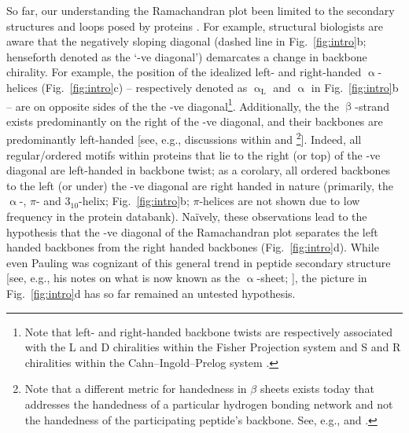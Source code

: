 \documentclass[fleqn,10pt]{wlpeerj} %
\newcommand{\Fig}[1]{Fig.~\ref{#1}}
\begin{document}
So far, our understanding the Ramachandran plot been limited to the secondary structures and loops posed by proteins \citep{Berman2000}. For example, structural biologists are aware that the negatively sloping diagonal (dashed line in \Fig{fig:intro}b; henseforth denoted as the `-ve diagonal') demarcates a change in backbone chirality. For example, the position of the idealized left- and right-handed $\upalpha$-helices (\Fig{fig:intro}c) -- respectively denoted as $\upalpha_\textrm{L}$ and $\upalpha$ in \Fig{fig:intro}b -- are on opposite sides of the the -ve diagonal\footnote{Note that left- and right-handed backbone twists are respectively associated with the L and D chiralities within the Fisher Projection system and S and R chiralities within the Cahn--Ingold--Prelog system \citep{Cross2013}.}. Additionally, the the $\upbeta$-strand exists predominantly on the right of the -ve diagonal, and their backbones are predominantly left-handed [see, e.g., discussions within \cite{Quiocho1977} and \cite{Shaw1977}\footnote{Note that a different metric for handedness in $\beta$ sheets exists today that addresses the handedness of a particular hydrogen bonding network and not the handedness of the participating peptide's backbone. See, e.g., \cite{Schulz1974} and \cite{Chothia1977}.}]. Indeed, all regular/ordered motifs within proteins that lie to the right (or top) of the -ve diagonal are left-handed in backbone twist; as a corolary, all ordered backbones to the left (or under) the -ve diagonal are right handed in nature (primarily, the $\upalpha$-, $\pi$- and $3_{10}$-helix; \Fig{fig:intro}b; $\pi$-helices are not shown due to low frequency in the protein databank). Na{\"i}vely, these observations lead to the hypothesis that the -ve diagonal of the Ramachandran plot separates the left handed backbones from the right handed backbones (\Fig{fig:intro}d). While even Pauling was cognizant of this general trend in peptide secondary structure [see, e.g., his notes on what is now known as the $\upalpha$-sheet; \cite{Pauling1951,Pauling1951a,Pauling1951b}], the picture in \Fig{fig:intro}d has so far remained an untested hypothesis.
\end{document}
